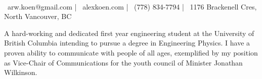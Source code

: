 \documentclass[]{awesome-cv}
\begin{document}
    
\begin{center}
	  \\
	\vspace{2mm}
	{\faEnvelope\ arw.koen@gmail.com} | {\faGlobe\ alexkoen.com} | {\faMobile\ (778) 834-7794} | {\faMapMarker\ 1176 Brackenell Cres, North Vancouver, BC}
\end{center}


A hard-working and dedicated first year engineering student at the University of British Columbia intending to pursue a degree in Engineering Physics. I have a proven ability to communicate with people of all ages, exemplified by my position as Vice-Chair of Communications for the youth council of Minister Jonathan Wilkinson.


\end{document}
